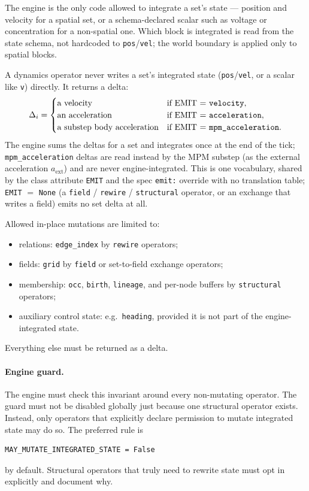 \documentclass[11pt]{article}
\newcommand{\code}[1]{\texttt{#1}}
\begin{document}
The engine is the only code allowed to integrate a set's state --- position and
velocity for a spatial set, or a schema-declared scalar such as voltage or
concentration for a non-spatial one. Which block is integrated is read from the state
schema, not hardcoded to \code{pos}/\code{vel}; the world boundary is applied only to
spatial blocks.

A dynamics operator never writes a set's integrated state (\code{pos}/\code{vel}, or
a scalar like \code{v}) directly. It returns a delta:
\[
\Delta_i =
\begin{cases}
\text{a velocity}                  & \text{if EMIT = \texttt{velocity}},\\
\text{an acceleration}             & \text{if EMIT = \texttt{acceleration}},\\
\text{a substep body acceleration} & \text{if EMIT = \texttt{mpm\_acceleration}}.
\end{cases}
\]
The engine sums the deltas for a set and integrates once at the end of the tick;
\texttt{mpm\_acceleration} deltas are read instead by the MPM substep (as the external
acceleration $a_\text{ext}$) and are never engine-integrated. This is one vocabulary,
shared by the class attribute \code{EMIT} and the spec \code{emit:} override with no
translation table; \code{EMIT} $=$ \code{None} (a \code{field} / \code{rewire} /
\code{structural} operator, or an exchange that writes a field) emits no set delta at all.

Allowed in-place mutations are limited to:
\begin{itemize}\itemsep2pt
\item relations: \code{edge\_index} by \code{rewire} operators;
\item fields: \code{grid} by \code{field} or set-to-field exchange operators;
\item membership: \code{occ}, \code{birth}, \code{lineage}, and per-node buffers by
\code{structural} operators;
\item auxiliary control state: e.g.\ \code{heading}, provided it is not part of the
engine-integrated state.
\end{itemize}
Everything else must be returned as a delta.

\paragraph{Engine guard.}
The engine must check this invariant around every non-mutating operator. The guard
must not be disabled globally just because one structural operator exists. Instead,
only operators that explicitly declare permission to mutate integrated state may do
so. The preferred rule is
\begin{lstlisting}[style=yaml]
MAY_MUTATE_INTEGRATED_STATE = False
\end{lstlisting}
by default. Structural operators that truly need to rewrite state must opt in
explicitly and document why.
\end{document}
